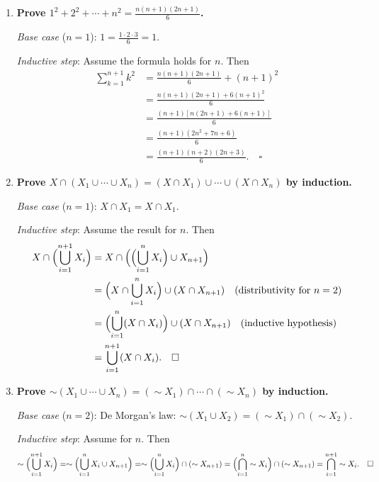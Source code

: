 \documentclass[11pt]{book}
\begin{document}
\begin{enumerate}[{0.}1. ]
\textit{Inductive step}: Assume $n! > 2^n$ for $n \geq 4$. Then
\[
(n+1)! = (n+1)\cdot n! > (n+1)\cdot 2^n \geq 5\cdot 2^n > 2 \cdot 2^n = 2^{n+1}. \quad\square
\]

\item \textbf{Prove $1^2+2^2+\cdots+n^2 = \frac{n(n+1)(2n+1)}{6}$.}

\textit{Base case} ($n=1$): $1 = \frac{1\cdot 2\cdot 3}{6}=1$. \checkmark

\textit{Inductive step}: Assume the formula holds for $n$. Then
\begin{align*}
\sum_{k=1}^{n+1}k^2 &= \frac{n(n+1)(2n+1)}{6} + (n+1)^2\\
&= \frac{n(n+1)(2n+1)+6(n+1)^2}{6}\\
&= \frac{(n+1)[n(2n+1)+6(n+1)]}{6}\\
&= \frac{(n+1)(2n^2+7n+6)}{6}\\
&= \frac{(n+1)(n+2)(2n+3)}{6}. \quad\square
\end{align*}

\item \textbf{Prove $X\cap(X_1\cup\cdots\cup X_n) = (X\cap X_1)\cup\cdots\cup(X\cap X_n)$ by induction.}

\textit{Base case} ($n=1$): $X\cap X_1 = X\cap X_1$. \checkmark

\textit{Inductive step}: Assume the result for $n$. Then
\begin{align*}
X\cap\Bigl(\bigcup_{i=1}^{n+1}X_i\Bigr)
&= X\cap\Bigl(\Bigl(\bigcup_{i=1}^n X_i\Bigr)\cup X_{n+1}\Bigr)\\
&= \Bigl(X\cap\bigcup_{i=1}^n X_i\Bigr)\cup(X\cap X_{n+1}) \quad\text{(distributivity for }n=2\text{)}\\
&= \Bigl(\bigcup_{i=1}^n(X\cap X_i)\Bigr)\cup(X\cap X_{n+1}) \quad\text{(inductive hypothesis)}\\
&= \bigcup_{i=1}^{n+1}(X\cap X_i). \quad\square
\end{align*}

\item \textbf{Prove $\sim(X_1\cup\cdots\cup X_n) = (\sim X_1)\cap\cdots\cap(\sim X_n)$ by induction.}

\textit{Base case} ($n=2$): De Morgan's law: $\sim(X_1\cup X_2)=(\sim X_1)\cap(\sim X_2)$. \checkmark

\textit{Inductive step}: Assume for $n$. Then
\[
\sim\Bigl(\bigcup_{i=1}^{n+1}X_i\Bigr) = \sim\Bigl(\bigcup_{i=1}^n X_i \cup X_{n+1}\Bigr) = \sim\Bigl(\bigcup_{i=1}^n X_i\Bigr)\cap(\sim X_{n+1}) = \Bigl(\bigcap_{i=1}^n\sim X_i\Bigr)\cap(\sim X_{n+1}) = \bigcap_{i=1}^{n+1}\sim X_i. \quad\square
\]


\end{enumerate}
\end{document}
